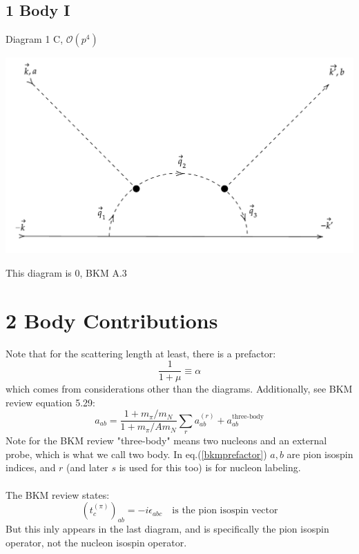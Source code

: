 \documentclass[11pt]{article}
\newcommand\mo{\mathcal{O}}
\begin{document}
\subsection{1 Body I}
Diagram 1 C, $\mo(p^4)$
\begin{center}
    \includegraphics[scale=0.6]{1i.pdf}
\end{center}
This diagram is $0$, BKM A.3
\newpage
\section{2 Body Contributions}
Note that for the scattering length at least, there is a prefactor:
\begin{equation}
    \frac{1}{1+\mu} \equiv \alpha
\end{equation}
which comes from considerations other than the diagrams. Additionally, see BKM review equation 5.29:
\begin{equation}
    a_{ab}= \frac{1+ m_\pi/m_N}{1+m_\pi/Am_N} \sum_r a^{(r)}_{ab} + a^{\text{three-body}}_{ab}\label{bkmprefactor}
\end{equation}
Note for the BKM review "three-body" means two nucleons and an external probe, which is what we call two body.
In eq.(\ref{bkmprefactor}) $a,b$ are pion isospin indices, and $r$ (and later $s$ is used for this too) is for nucleon labeling. \\~\\

The BKM review states:
\begin{equation}
    (t_c^{(\pi)})_{ab}= -i \epsilon_{abc}\quad\text{is the pion isospin vector}
\end{equation}
But this inly appears in the last diagram, and is specifically the pion isospin operator, not the nucleon isospin operator.
\end{document}
